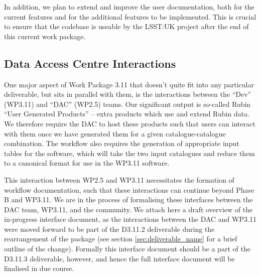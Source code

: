 \documentclass[a4paper,11pt]{scrartcl}
\begin{document}
In addition, we plan to extend and improve the user documentation, both for the current features and for the additional features to be implemented.
This is crucial to ensure that the codebase is useable by the LSST:UK project after the end of this current work package.

\subsection{Data Access Centre Interactions}
One major aspect of Work Package 3.11 that doesn't quite fit into any particular deliverable, but sits in parallel with them, is the interactions between the ``Dev'' (WP3.11) and ``DAC'' (WP2.5) teams.
Our significant output is so-called Rubin ``User Generated Products'' -- extra products which use and extend Rubin data.
We therefore require the DAC to host these products such that users can interact with them once we have generated them for a given catalogue-catalogue combination.
The workflow also requires the generation of appropriate input tables for the software, which will take the two input catalogues and reduce them to a canonical format for use in the WP3.11 software.

This interaction between WP2.5 and WP3.11 necessitates the formation of workflow documentation, such that these interactions can continue beyond Phase B and WP3.11.
We are in the process of formalising these interfaces between the DAC team, WP3.11, and the community.
We attach here a draft overview of the in-progress interface document, as the interactions between the DAC and WP3.11 were moved forward to be part of the D3.11.2 deliverable during the rearrangement of the package (see section \ref{sec:deliverable_name} for a brief outline of the change).
Formally this interface document should be a part of the D3.11.3 deliverable, however, and hence the full interface document will be finalised in due course.


\end{document}
